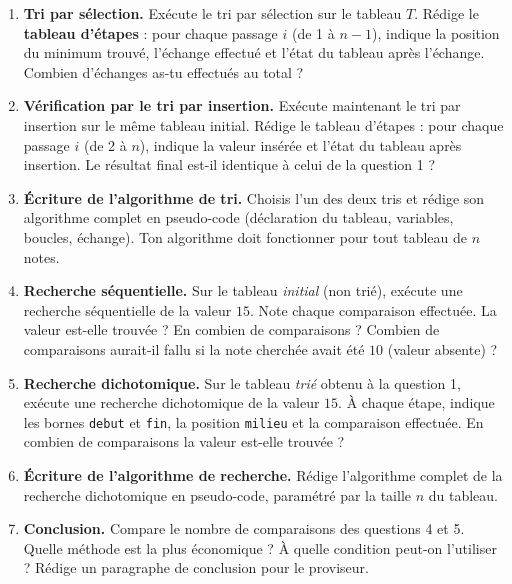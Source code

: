 \documentclass[11pt]{article}
\newcounter{popsec}
\newcounter{popsub}
\newcommand{\courssub}[1]{%
  \stepcounter{popsub}%
  \par\vspace{9pt}\noindent{\popxbold\fontsize{11.5}{13}\selectfont\color{popink}{\color{poporange}\thepopsec.\thepopsub}\hspace{6pt}#1}\par\nopagebreak\vspace{4pt}
}
\begin{document}
\begin{enumerate}
\item \textbf{Tri par sélection.} Exécute le tri par sélection sur le tableau $T$. Rédige le \textbf{tableau d'étapes} : pour chaque passage $i$ (de 1 à $n-1$), indique la position du minimum trouvé, l'échange effectué et l'état du tableau après l'échange. Combien d'échanges as-tu effectués au total ?
\item \textbf{Vérification par le tri par insertion.} Exécute maintenant le tri par insertion sur le même tableau initial. Rédige le tableau d'étapes : pour chaque passage $i$ (de 2 à $n$), indique la valeur insérée et l'état du tableau après insertion. Le résultat final est-il identique à celui de la question 1 ?
\item \textbf{Écriture de l'algorithme de tri.} Choisis l'un des deux tris et rédige son algorithme complet en pseudo-code (déclaration du tableau, variables, boucles, échange). Ton algorithme doit fonctionner pour tout tableau de $n$ notes.
\item \textbf{Recherche séquentielle.} Sur le tableau \emph{initial} (non trié), exécute une recherche séquentielle de la valeur $15$. Note chaque comparaison effectuée. La valeur est-elle trouvée ? En combien de comparaisons ? Combien de comparaisons aurait-il fallu si la note cherchée avait été $10$ (valeur absente) ?
\item \textbf{Recherche dichotomique.} Sur le tableau \emph{trié} obtenu à la question 1, exécute une recherche dichotomique de la valeur $15$. À chaque étape, indique les bornes \texttt{debut} et \texttt{fin}, la position \texttt{milieu} et la comparaison effectuée. En combien de comparaisons la valeur est-elle trouvée ?
\item \textbf{Écriture de l'algorithme de recherche.} Rédige l'algorithme complet de la recherche dichotomique en pseudo-code, paramétré par la taille $n$ du tableau.
\item \textbf{Conclusion.} Compare le nombre de comparaisons des questions 4 et 5. Quelle méthode est la plus économique ? À quelle condition peut-on l'utiliser ? Rédige un paragraphe de conclusion pour le proviseur.
\end{enumerate}

\courssub{Ressources à mobiliser}
\end{document}
